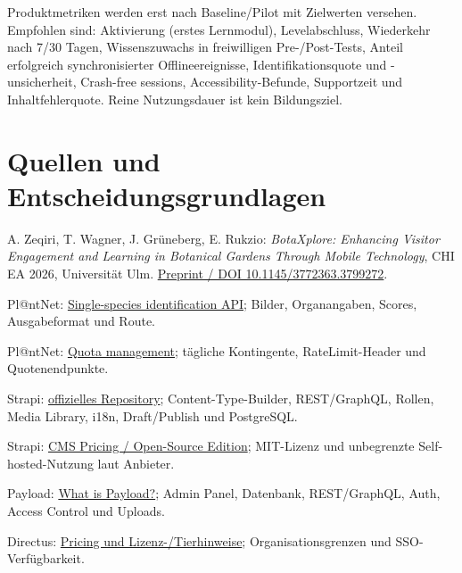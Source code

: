 \documentclass[10pt,a4paper,oneside]{article}
\begin{document}
Produktmetriken werden erst nach Baseline/Pilot mit Zielwerten versehen. Empfohlen sind: Aktivierung (erstes Lernmodul), Levelabschluss, Wiederkehr nach 7/30 Tagen, Wissenszuwachs in freiwilligen Pre-/Post-Tests, Anteil erfolgreich synchronisierter Offlineereignisse, Identifikationsquote und -unsicherheit, Crash-free sessions, Accessibility-Befunde, Supportzeit und Inhaltfehlerquote. Reine Nutzungsdauer ist kein Bildungsziel.

\section{Quellen und Entscheidungsgrundlagen}

\small
\begin{enumerate}[leftmargin=9mm,label={\textcolor{Forest}{[\arabic*]}}]
  \hypertarget{src:1}{}\item A. Zeqiri, T. Wagner, J. Grüneberg, E. Rukzio: \emph{BotaXplore: Enhancing Visitor Engagement and Learning in Botanical Gardens Through Mobile Technology}, CHI EA 2026, Universität Ulm. \href{https://www.uni-ulm.de/fileadmin/website_uni_ulm/iui.inst.100/institut/mitarbeiterbereiche/zeqiri/papers/preprint_botaxplore.pdf}{Preprint / DOI 10.1145/3772363.3799272}.
  \hypertarget{src:2}{}\item Pl@ntNet: \href{https://my.plantnet.org/doc/api/identify}{Single-species identification API}; Bilder, Organangaben, Scores, Ausgabeformat und Route.
  \hypertarget{src:3}{}\item Pl@ntNet: \href{https://my.plantnet.org/doc/api/quota}{Quota management}; tägliche Kontingente, RateLimit-Header und Quotenendpunkte.
  \hypertarget{src:4}{}\item Strapi: \href{https://github.com/strapi/strapi}{offizielles Repository}; Content-Type-Builder, REST/GraphQL, Rollen, Media Library, i18n, Draft/Publish und PostgreSQL.
  \hypertarget{src:5}{}\item Strapi: \href{https://strapi.io/pricing-cms}{CMS Pricing / Open-Source Edition}; MIT-Lizenz und unbegrenzte Self-hosted-Nutzung laut Anbieter.
  \hypertarget{src:6}{}\item Payload: \href{https://payloadcms.com/docs/getting-started/what-is-payload}{What is Payload?}; Admin Panel, Datenbank, REST/GraphQL, Auth, Access Control und Uploads.
  \hypertarget{src:7}{}\item Directus: \href{https://directus.io/pricing}{Pricing und Lizenz-/Tierhinweise}; Organisationsgrenzen und SSO-Verfügbarkeit.

\end{enumerate}
\end{document}
